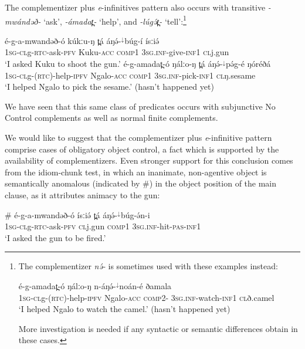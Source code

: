 The complementizer plus \textit{e}-infinitives pattern also occurs with transitive \textit{-mwándəð-} `ask', \textit{-ámadat̪-} `help', and \textit{-lúgə́t̪-} `tell':\footnote{The complementizer \textit{nə́-} is sometimes used with these examples instead:

\ea \gll  é-g-amadat̪-ó ŋálːo-ŋ n-áŋə́-$^{↓}$noán-é ðamala	 \\
\textsc{1sg-cl}g-(\textsc{rtc})-help-\textsc{ipfv}  Ngalo-\textsc{acc} \textsc{comp2}- \textsc{3sg.inf}-watch-\textsc{inf1}   \textsc{cl}ð.camel\\
\glt ‘I helped Ngalo to watch the camel.’ (hasn’t happened yet) 
\z

More investigation is needed if any syntactic or semantic differences obtain in these cases.}

\ea
	\ea	\gll é-g-a-mwandəð-ó kúkːu-ŋ t̪á áŋə́-$^{↓}$búg-í ísːiə́   \\
\textsc{1sg-cl}g-\textsc{rtc}-ask-\textsc{pfv}  Kuku-\textsc{acc} \textsc{comp1}  \textsc{3sg.inf}-give-\textsc{inf1}  \textsc{cl}j.gun \\
		\glt ‘I asked Kuku to shoot the gun.’
	\ex  \gll   é-g-amadat̪-ó ŋálːo-ŋ t̪á áŋə́-$^{↓}$pə́g-é ŋóréðá	 \\
\textsc{1sg-cl}g-(\textsc{rtc})-help-\textsc{ipfv}  Ngalo-\textsc{acc} \textsc{comp1} \textsc{3sg.inf}-pick-\textsc{inf1}  \textsc{cl}ŋ.sesame\\
	\glt ‘I helped Ngalo to pick the sesame.’ (hasn’t happened yet) \label{help}
\z 
\z 

We have seen that this same class of predicates occurs with subjunctive No Control complements as well as normal finite complements.

We would like to suggest that the complementizer plus \textit{e}-infinitive pattern comprise cases of obligatory object control, a fact which is supported by the availability  of complementizers. Even stronger support for this conclusion comes from the idiom-chunk test, in which an inanimate, non-agentive object is semantically anomalous (indicated by #) in the object position of the main clause, as it attributes animacy to the gun:

\ea \gll \# é-g-a-mwandəð-ó ísːiə́ t̪á áŋə́-$^{↓}$búg-ə́n-i\\
\textsc{1sg-cl}g-\textsc{rtc}-ask-\textsc{pfv}  \textsc{cl}j.gun \textsc{comp1}  \textsc{3sg.inf}-hit-\textsc{pas}-\textsc{inf1}   \\
\glt ‘I asked the gun to be fired.’
\z 

